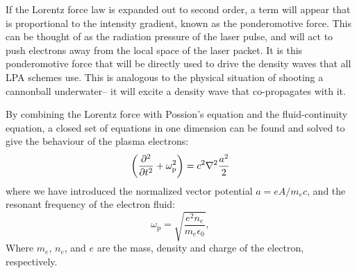 \documentclass[12pt,letter]{article}
\begin{document}
If the Lorentz force law is expanded out to second order, a term will appear that is
proportional to the intensity gradient, known as the ponderomotive force. This can be
thought of as the radiation pressure of the laser pulse, and will act to push
electrons away from the local space of the laser packet. It is this
ponderomotive force that will be directly used to drive the density waves that
all LPA schemes use. This is analogous to the physical situation of shooting a
cannonball underwater-- it will excite a density wave that co-propagates with
it.

By combining the Lorentz force with Possion's equation and the
fluid-continuity equation, a closed set of equations in one dimension can be found and solved to
give the behaviour of the plasma electrons:
\begin{equation}
    \label{eq:wave}
    \qty( \pdv[2]{t} + \omega_\mathrm{p}^2 ) = c^2 \laplacian \frac{a^2}{2}
\end{equation}
where we have introduced the normalized vector potential $a = eA/m_e c$, and the
resonant frequency of the electron fluid:
\begin{equation}
    \label{eq:wp}
    \omega_\mathrm{p} = \sqrt{\frac{e^2 n_e}{m_e \epsilon_0}},
\end{equation}
Where $m_e$, $n_e$, and $e$ are the mass, density and charge of the electron, respectively.
\end{document}
